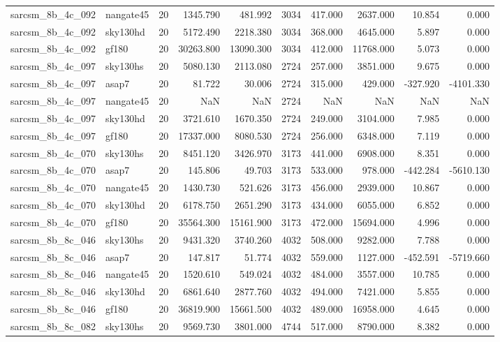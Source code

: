 \begin{longtable}{llrrrrrrrr}
sarcsm\_8b\_4c\_092 & nangate45 & 20 & 1345.790 & 481.992 & 3034 & 417.000 & 2637.000 & 10.854 & 0.000 \\
sarcsm\_8b\_4c\_092 & sky130hd & 20 & 5172.490 & 2218.380 & 3034 & 368.000 & 4645.000 & 5.897 & 0.000 \\
sarcsm\_8b\_4c\_092 & gf180 & 20 & 30263.800 & 13090.300 & 3034 & 412.000 & 11768.000 & 5.073 & 0.000 \\
sarcsm\_8b\_4c\_097 & sky130hs & 20 & 5080.130 & 2113.080 & 2724 & 257.000 & 3851.000 & 9.675 & 0.000 \\
sarcsm\_8b\_4c\_097 & asap7 & 20 & 81.722 & 30.006 & 2724 & 315.000 & 429.000 & -327.920 & -4101.330 \\
sarcsm\_8b\_4c\_097 & nangate45 & 20 & NaN & NaN & 2724 & NaN & NaN & NaN & NaN \\
sarcsm\_8b\_4c\_097 & sky130hd & 20 & 3721.610 & 1670.350 & 2724 & 249.000 & 3104.000 & 7.985 & 0.000 \\
sarcsm\_8b\_4c\_097 & gf180 & 20 & 17337.000 & 8080.530 & 2724 & 256.000 & 6348.000 & 7.119 & 0.000 \\
sarcsm\_8b\_4c\_070 & sky130hs & 20 & 8451.120 & 3426.970 & 3173 & 441.000 & 6908.000 & 8.351 & 0.000 \\
sarcsm\_8b\_4c\_070 & asap7 & 20 & 145.806 & 49.703 & 3173 & 533.000 & 978.000 & -442.284 & -5610.130 \\
sarcsm\_8b\_4c\_070 & nangate45 & 20 & 1430.730 & 521.626 & 3173 & 456.000 & 2939.000 & 10.867 & 0.000 \\
sarcsm\_8b\_4c\_070 & sky130hd & 20 & 6178.750 & 2651.290 & 3173 & 434.000 & 6055.000 & 6.852 & 0.000 \\
sarcsm\_8b\_4c\_070 & gf180 & 20 & 35564.300 & 15161.900 & 3173 & 472.000 & 15694.000 & 4.996 & 0.000 \\
sarcsm\_8b\_8c\_046 & sky130hs & 20 & 9431.320 & 3740.260 & 4032 & 508.000 & 9282.000 & 7.788 & 0.000 \\
sarcsm\_8b\_8c\_046 & asap7 & 20 & 147.817 & 51.774 & 4032 & 559.000 & 1127.000 & -452.591 & -5719.660 \\
sarcsm\_8b\_8c\_046 & nangate45 & 20 & 1520.610 & 549.024 & 4032 & 484.000 & 3557.000 & 10.785 & 0.000 \\
sarcsm\_8b\_8c\_046 & sky130hd & 20 & 6861.640 & 2877.760 & 4032 & 494.000 & 7421.000 & 5.855 & 0.000 \\
sarcsm\_8b\_8c\_046 & gf180 & 20 & 36819.900 & 15661.500 & 4032 & 489.000 & 16958.000 & 4.645 & 0.000 \\
sarcsm\_8b\_8c\_082 & sky130hs & 20 & 9569.730 & 3801.000 & 4744 & 517.000 & 8790.000 & 8.382 & 0.000 \\

\end{longtable}
